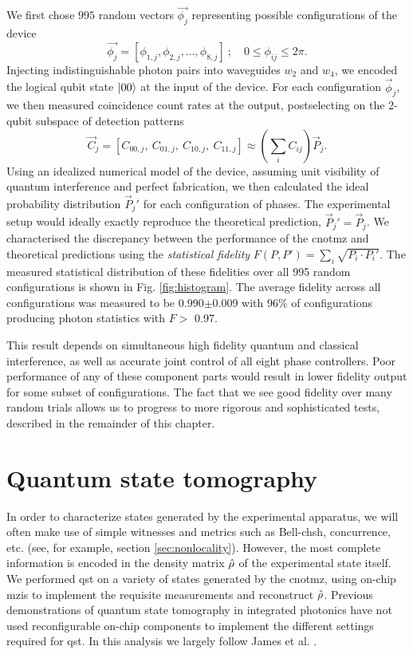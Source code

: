 We first chose $995$ random vectors $\vec{\phi_{j}}$ representing possible configurations of the device
\begin{equation}
\vec{\phi_{j}} = \left [ \phi_{1, j}, \phi_{2, j},...,\phi_{8, j}\right]
~; \quad 
0\le\phi_{ij}\le2\pi.
\end{equation}
Injecting indistinguishable photon pairs into waveguides $w_2$ and $w_4$, we encoded the logical qubit state $\mbox{$ | 00 \rangle $}$ at the input of the device. For each configuration $\vec{\phi}_j$, we then measured coincidence count rates at the output, postselecting on the 2-qubit subspace of detection patterns 
\begin{equation}
   \vec{C}_j = \left[ C_{00,j},~C_{01,j},~C_{10,j},~C_{11,j}  \right]
   \approx \left(\sum_i{C_{ij}}\right) \vec{P}_{j}.
\end{equation}
Using an idealized numerical model of the device, assuming unit visibility of quantum interference and perfect fabrication, we then calculated the ideal probability distribution 
$\vec{P}_{j}'$ for each configuration of phases. The experimental setup would ideally exactly reproduce the theoretical prediction, $\vec{P}_{j}' = \vec{P}_{j}$. We characterised the discrepancy between the performance of the \gls{cnotmz} and theoretical predictions using the \emph{statistical fidelity} $F(P, P')=\sum_{i}\sqrt{P_{i}\cdot P_{i}'}$.  The measured statistical distribution of these fidelities over all 995 random configurations is shown in Fig. \ref{fig:histogram}. 
The average fidelity across all configurations was measured to be 0.990$\pm$0.009 with 96\% of configurations producing photon statistics with $F >$ 0.97. 

This result depends on simultaneous high fidelity quantum and classical interference, as well as accurate joint control of all eight phase controllers. Poor performance of any of these component parts would result in lower fidelity output for some subset of 
configurations. The fact that we see good fidelity over many random trials allows us to progress to more rigorous and sophisticated tests, described in the remainder of this chapter.

\section{Quantum state tomography} 
\label{sec:state-tomography}
In order to characterize states generated by the experimental apparatus, we will often make use of simple witnesses and metrics such as Bell-\acrshort{chsh}, concurrence, etc. (see,  for example, section \ref{sec:nonlocality}). However, the most complete information is encoded in the density matrix $\hat{\rho}$ of the experimental state itself. We performed \gls{qst} on a variety of states generated by the \gls{cnotmz}, using on-chip \glspl{mzi} to implement the requisite measurements and reconstruct $\hat{\rho}$. Previous demonstrations of quantum state tomography in integrated photonics have not used reconfigurable on-chip components to implement the different settings required for \gls{qst}.
In this analysis we largely follow James et al. \cite{James2001}.

